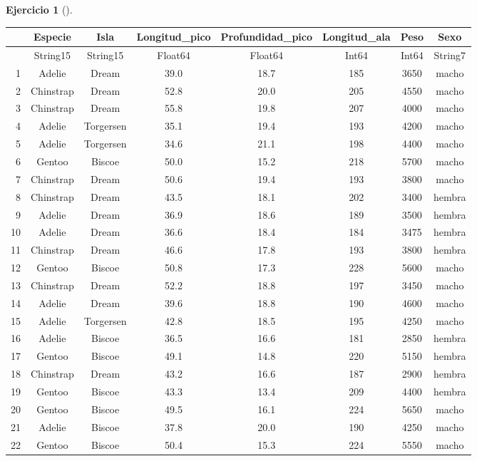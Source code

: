 \documentclass[
  a4paper,
]{scrreport}
\theoremstyle{definition}
\newtheorem{exercise}{Ejercicio}[chapter]
\theoremstyle{remark}
\begin{document}
\begin{exercise}[]
\begin{enumerate}
\begin{tcolorbox}
  \begin{tabular}{r|ccccccc}
      & Especie & Isla & Longitud\_pico & Profundidad\_pico & Longitud\_ala & Peso & Sexo\\
      \hline
      & String15 & String15 & Float64 & Float64 & Int64 & Int64 & String7\\
      \hline
      1 & Adelie & Dream & 39.0 & 18.7 & 185 & 3650 & macho \\
      2 & Chinstrap & Dream & 52.8 & 20.0 & 205 & 4550 & macho \\
      3 & Chinstrap & Dream & 55.8 & 19.8 & 207 & 4000 & macho \\
      4 & Adelie & Torgersen & 35.1 & 19.4 & 193 & 4200 & macho \\
      5 & Adelie & Torgersen & 34.6 & 21.1 & 198 & 4400 & macho \\
      6 & Gentoo & Biscoe & 50.0 & 15.2 & 218 & 5700 & macho \\
      7 & Chinstrap & Dream & 50.6 & 19.4 & 193 & 3800 & macho \\
      8 & Chinstrap & Dream & 43.5 & 18.1 & 202 & 3400 & hembra \\
      9 & Adelie & Dream & 36.9 & 18.6 & 189 & 3500 & hembra \\
      10 & Adelie & Dream & 36.6 & 18.4 & 184 & 3475 & hembra \\
      11 & Chinstrap & Dream & 46.6 & 17.8 & 193 & 3800 & hembra \\
      12 & Gentoo & Biscoe & 50.8 & 17.3 & 228 & 5600 & macho \\
      13 & Chinstrap & Dream & 52.2 & 18.8 & 197 & 3450 & macho \\
      14 & Adelie & Dream & 39.6 & 18.8 & 190 & 4600 & macho \\
      15 & Adelie & Torgersen & 42.8 & 18.5 & 195 & 4250 & macho \\
      16 & Adelie & Biscoe & 36.5 & 16.6 & 181 & 2850 & hembra \\
      17 & Gentoo & Biscoe & 49.1 & 14.8 & 220 & 5150 & hembra \\
      18 & Chinstrap & Dream & 43.2 & 16.6 & 187 & 2900 & hembra \\
      19 & Gentoo & Biscoe & 43.3 & 13.4 & 209 & 4400 & hembra \\
      20 & Gentoo & Biscoe & 49.5 & 16.1 & 224 & 5650 & macho \\
      21 & Adelie & Biscoe & 37.8 & 20.0 & 190 & 4250 & macho \\
      22 & Gentoo & Biscoe & 50.4 & 15.3 & 224 & 5550 & macho \\

\end{tabular}
\end{tcolorbox}
\end{enumerate}
\end{exercise}
\end{document}
